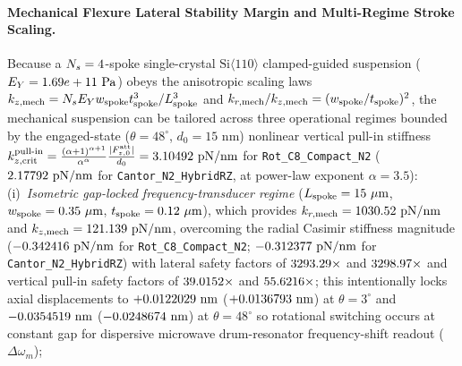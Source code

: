 \paragraph{Mechanical Flexure Lateral Stability Margin and Multi-Regime Stroke Scaling.}
Because a $N_s = 4{}$-spoke single-crystal $\text{Si}\langle 110\rangle$ clamped-guided suspension ($E_Y = 1.69e+11{}\text{ Pa}$) obeys the anisotropic scaling laws $k_{z,\rm mech} = N_s E_Y w_{\rm spoke} t_{\rm spoke}^3 / L_{\rm spoke}^3$ and $k_{r,\rm mech} / k_{z,\rm mech} = (w_{\rm spoke} / t_{\rm spoke})^2$, the mechanical suspension can be tailored across three operational regimes bounded by the engaged-state ($\theta=48^\circ$, $d_0=15\text{ nm}$) nonlinear vertical pull-in stiffness $k_{z,\rm crit}^{\rm pull\text{-}in} = \frac{(\alpha+1)^{\alpha+1}}{\alpha^\alpha}\frac{|F_{z,0}^{\rm att}|}{d_0} = 3.10492{}\text{ pN/nm}$ for \texttt{Rot\_C8\_Compact\_N2} ($2.17792{}\text{ pN/nm}$ for \texttt{Cantor\_N2\_HybridRZ}, at power-law exponent $\alpha=3.5$):
(i)~\emph{Isometric gap-locked frequency-transducer regime} ($L_{\rm spoke} = \NatureRotCeightCompactNtwoLateralStabilityLSpokeUm{}\ \mu\text{m}$, $w_{\rm spoke} = \NatureRotCeightCompactNtwoLateralStabilityWSpokeUm{}\ \mu\text{m}$, $t_{\rm spoke} = \NatureRotCeightCompactNtwoLateralStabilityTSpokeUm{}\ \mu\text{m}$), which provides $k_{r,\rm mech} = 1030.52{}\text{ pN/nm}$ and $k_{z,\rm mech} = 121.139{}\text{ pN/nm}$, overcoming the radial Casimir stiffness magnitude ($-0.342416{}\text{ pN/nm}$ for \texttt{Rot\_C8\_Compact\_N2}; $-0.312377{}\text{ pN/nm}$ for \texttt{Cantor\_N2\_HybridRZ}) with lateral safety factors of $3293.29{}\times$ and $3298.97{}\times$ and vertical pull-in safety factors of $39.0152{}\times$ and $55.6216{}\times$; this intentionally locks axial displacements to $+0.0122029{}\text{ nm}$ ($+0.0136793{}\text{ nm}$) at $\theta=3^\circ$ and $-0.0354519{}\text{ nm}$ ($-0.0248674{}\text{ nm}$) at $\theta=48^\circ$ so rotational switching occurs at constant gap for dispersive microwave drum-resonator frequency-shift readout ($\Delta\omega_m$);

